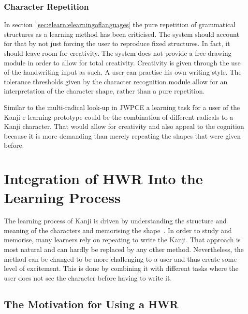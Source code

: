 \subsubsection{Character Repetition}
\label{sec:concept:characterrepetition} %

In section~\ref{sec:elearn:elearningoflanguages} the pure repetition of 
grammatical structures as a learning method has been criticised.
The system should account for that by not just forcing the user to
reproduce fixed structures. In fact, it should leave room for creativity.
The system does not provide a free-drawing module in order to allow for
total creativity. Creativity is given through the use of the
handwriting input as such. A user can practise his own writing style.
The tolerance thresholds given by the character recognition module allow for an
interpretation of the character shape, rather than a pure repetition.

Similar to the multi-radical look-up in JWPCE a learning task for a user
of the Kanji e-learning prototype could be the combination 
of different radicals to a Kanji character.
That would allow for creativity and also appeal to the cognition because
it is more demanding than merely repeating the shapes that were given before.


\section{Integration of HWR Into the Learning Process}
\label{sec:concept:integrationofhwrintolearning}

The learning process of Kanji is driven by understanding the structure and 
meaning of the characters and memorising the shape~. 
In order to study and memorise, many learners rely on repeating to write the 
Kanji. That approach is most natural and can hardly be replaced by any other 
method. Nevertheless, the method can be changed to be more challenging to
a user and thus create some level of excitement. This is done by combining
it with different tasks where the user does not see the character before
having to write it.

\subsection{The Motivation for Using a HWR}
\label{sec:concept:motivationforusinghwr}

